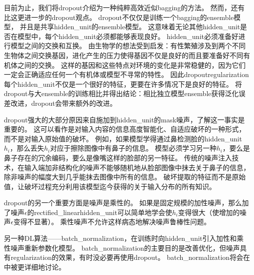 
目前为止，我们将\gls{dropout}介绍为一种纯粹高效近似\gls{bagging}的方法。
然而，还有比这更进一步的\gls{dropout}观点。
\gls{dropout}不仅仅是训练一个\gls{bagging}的\gls{ensemble}模型，
并且是共享\gls{hidden_unit}的\gls{ensemble}模型。
这意味着无论其他\gls{hidden_unit}是否在模型中，每个\gls{hidden_unit}必须都能够表现良好。
\gls{hidden_unit}必须准备好进行模型之间的交换和互换。
\cite{Hinton-et-al-2012c}由生物学的想法受到启发：有性繁殖涉及到两个不同生物体之间交换基因，进化产生的压力使得基因不仅是良好的而且要准备好不同有机体之间的交换。
这样的基因和这些特点对环境的变化是非常稳健的，因为它们一定会正确适应任何一个有机体或模型不寻常的特性。
因此\gls{dropout}\gls{regularization}每个\gls{hidden_unit}不仅是一个很好的特征，更要在许多情况下是良好的特征。
\cite{WardeFarley-et-al-2014}将\gls{dropout}与大\gls{ensemble}的训练相比并得出结论：相比独立模型\gls{ensemble}获得泛化误差改进，\gls{dropout}会带来额外的改进。

\gls{dropout}强大的大部分原因来自施加到\gls{hidden_unit}的\gls{mask}噪声，了解这一事实是重要的。
这可以看作是对输入内容的信息高度智能化、自适应破坏的一种形式，而不是对输入原始值的破坏。
例如，如果模型学得通过鼻检测脸的\gls{hidden_unit} $h_i$，那么丢失$h_i$对应于擦除图像中有鼻子的信息。
模型必须学习另一种$h_i$，要么是鼻子存在的冗余编码，要么是像嘴这样的脸部的另一特征。
传统的噪声注入技术，在输入端加非结构化的噪声不能够随机地从脸部图像中抹去关于鼻子的信息，除非噪声的幅度大到几乎能抹去图像中所有的信息。
破坏提取的特征而不是原始值，让破坏过程充分利用该模型迄今获得的关于输入分布的所有知识。

\gls{dropout}的另一个重要方面是噪声是乘性的。
如果是固定规模的加性噪声，那么加了噪声$\epsilon$的\gls{rectified_linear}\gls{hidden_unit}可以简单地学会使$h_i$变得很大（使增加的噪声$\epsilon$变得不显著）。
乘性噪声不允许这样病态地解决噪声鲁棒性问题。


另一种\gls{DL}算法——\gls{batch_normalization}，在训练时向\gls{hidden_unit}引入加性和乘性噪声重新参数化模型。
\gls{batch_normalization}的主要目的是改善优化，但噪声具有\gls{regularization}的效果，有时没必要再使用\gls{dropout}。
\gls{batch_normalization}将会在中被更详细地讨论。



